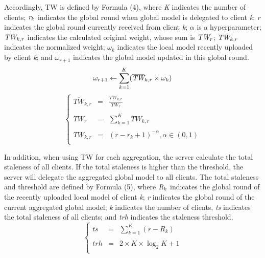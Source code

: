 \documentclass[twoside,twocolumn]{article}
\begin{document}
\begin{spacing}{1.0}
	Accordingly, TW is defined by Formula (4), where \emph{K} indicates the number of clients; $\emph{r}_k$ indicates the global round when global model is delegated to client \emph{k}; \emph{r} indicates the global round currently received from client \emph{k}; $\alpha$ is a hyperparameter; $\emph{TW}_{k,r}$ indicates the calculated original weight, whose sum is $\emph{TW}_r$; $\overline{\emph{TW}}_{k,r}$ indicates the normalized weight; $\omega_{k}$ indicates the local model recently uploaded by client \emph{k}; and $\omega_{r+1}$ indicates the global model updated in this global round.
\begin{equation}
\omega_{r+1} \leftarrow \sum_{k=1}^{K}(\overline{\emph{TW}}_{k,r} \times \omega_k)
\end{equation}
%
\begin{equation}
\left\{
\begin{array}{lll}
\overline{TW}_{k,r} & = & \frac{TW_{k,r}}{TW_{r}}\\
\\
TW_{r} & = & \sum_{k=1}^{K} TW_{k,r}\\
\\
TW_{k,r} & = & (r-r_{k}+1)^{-\alpha},\alpha \in (0,1)\\
\end{array}
\right.
\end{equation}

	In addition, when using TW for each aggregation, the server calculate the total staleness of all clients. If the total staleness is higher than the threshold, the server will delegate the aggregated global model to all clients. The total staleness and threshold are defined by Formula (5), where $\emph{R}_k$ indicates the global round of the recently uploaded local model of client \emph{k}; \emph{r} indicates the global round of the current aggregated global model; \emph{k} indicates the number of clients, \emph{ts} indicates the total staleness of all clients; and \emph{trh} indicates the staleness threshold.
\begin{equation}
\left\{
\begin{array}{lll}
ts &=& \sum_{k=1}^{K} (r - R_{k})\\
\\
trh&=&2\times K \times \log_{2}{K} + 1\\
\end{array}
\right.
\end{equation}


\end{spacing}
\end{document}
